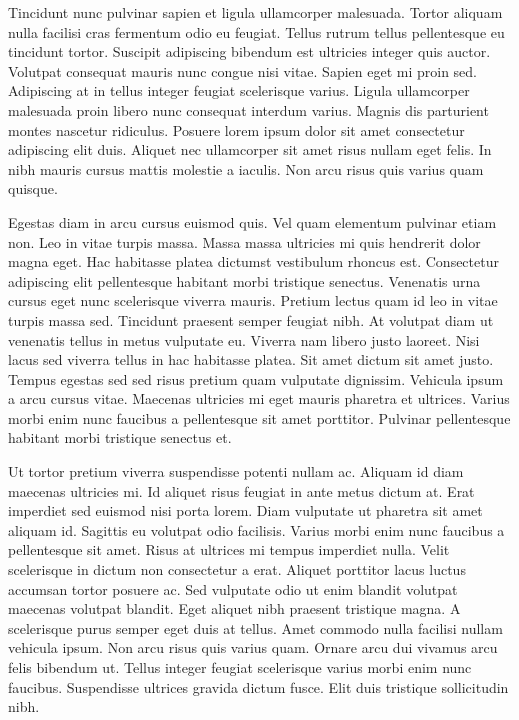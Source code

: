 \documentclass[11pt,a4paper]{article}
\begin{document}
Tincidunt nunc pulvinar sapien et ligula ullamcorper malesuada. Tortor aliquam nulla facilisi cras fermentum odio eu feugiat. Tellus rutrum tellus pellentesque eu tincidunt tortor. Suscipit adipiscing bibendum est ultricies integer quis auctor. Volutpat consequat mauris nunc congue nisi vitae. Sapien eget mi proin sed. Adipiscing at in tellus integer feugiat scelerisque varius. Ligula ullamcorper malesuada proin libero nunc consequat interdum varius. Magnis dis parturient montes nascetur ridiculus. Posuere lorem ipsum dolor sit amet consectetur adipiscing elit duis. Aliquet nec ullamcorper sit amet risus nullam eget felis. In nibh mauris cursus mattis molestie a iaculis. Non arcu risus quis varius quam quisque.

Egestas diam in arcu cursus euismod quis. Vel quam elementum pulvinar etiam non. Leo in vitae turpis massa. Massa massa ultricies mi quis hendrerit dolor magna eget. Hac habitasse platea dictumst vestibulum rhoncus est. Consectetur adipiscing elit pellentesque habitant morbi tristique senectus. Venenatis urna cursus eget nunc scelerisque viverra mauris. Pretium lectus quam id leo in vitae turpis massa sed. Tincidunt praesent semper feugiat nibh. At volutpat diam ut venenatis tellus in metus vulputate eu. Viverra nam libero justo laoreet. Nisi lacus sed viverra tellus in hac habitasse platea. Sit amet dictum sit amet justo. Tempus egestas sed sed risus pretium quam vulputate dignissim. Vehicula ipsum a arcu cursus vitae. Maecenas ultricies mi eget mauris pharetra et ultrices. Varius morbi enim nunc faucibus a pellentesque sit amet porttitor. Pulvinar pellentesque habitant morbi tristique senectus et.

Ut tortor pretium viverra suspendisse potenti nullam ac. Aliquam id diam maecenas ultricies mi. Id aliquet risus feugiat in ante metus dictum at. Erat imperdiet sed euismod nisi porta lorem. Diam vulputate ut pharetra sit amet aliquam id. Sagittis eu volutpat odio facilisis. Varius morbi enim nunc faucibus a pellentesque sit amet. Risus at ultrices mi tempus imperdiet nulla. Velit scelerisque in dictum non consectetur a erat. Aliquet porttitor lacus luctus accumsan tortor posuere ac. Sed vulputate odio ut enim blandit volutpat maecenas volutpat blandit. Eget aliquet nibh praesent tristique magna. A scelerisque purus semper eget duis at tellus. Amet commodo nulla facilisi nullam vehicula ipsum. Non arcu risus quis varius quam. Ornare arcu dui vivamus arcu felis bibendum ut. Tellus integer feugiat scelerisque varius morbi enim nunc faucibus. Suspendisse ultrices gravida dictum fusce. Elit duis tristique sollicitudin nibh.
\end{document}
